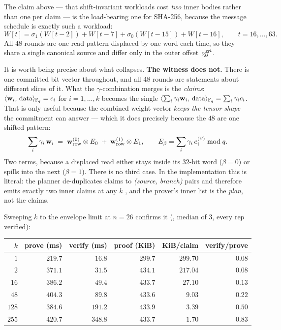The claim above --- that shift-invariant workloads cost \emph{two} inner bodies
rather than one per claim --- is the load-bearing one for SHA-256, because the
message schedule is exactly such a workload:
\[
  W[t]=\sigma_1(W[t-2])+W[t-7]+\sigma_0(W[t-15])+W[t-16],
  \qquad t=16,\dots,63 .
\]
All $48$ rounds are one read pattern displaced by one word each time, so they
share a single canonical source and differ only in the outer offset $\mathit{off}^t$.

It is worth being precise about what collapses. \textbf{The witness does not.}
There is one committed bit vector throughout, and all $48$ rounds are statements
about different slices of it. What the $\gamma$-combination merges is the
\emph{claims}: $\langle \mathbf{w}_i,\, \text{data}\rangle_{\mathbb{F}_q}=c_i$ for $i=1,\dots,k$ becomes the single
$\langle \sum_i\gamma_i\mathbf{w}_i,\, \text{data}\rangle_{\mathbb{F}_q}=\sum_i\gamma_ic_i$. That is only useful
because the combined weight vector \emph{keeps the tensor shape} the commitment
can answer --- which it does precisely because the $48$ are one shifted pattern:
\[
  \sum_i \gamma_i\,\mathbf{w}_i
  \;=\; \mathbf{w}_{\mathrm{row}}^{(0)}\otimes E_0 \;+\; \mathbf{w}_{\mathrm{row}}^{(1)}\otimes E_1,
  \qquad E_\beta=\sum_i \gamma_i\,e_i^{(\beta)} \bmod q .
\]
Two terms, because a displaced read either stays inside its $32$-bit word
($\beta{=}0$) or spills into the next ($\beta{=}1$). There is no third case.
In the implementation this is literal: the planner de-duplicates claims to
\emph{(source, branch)} pairs and therefore emits exactly two inner claims at any
$k$ , and the prover's inner
list is the \emph{plan}, not the claims.

Sweeping $k$ to the envelope limit at $n{=}26$ confirms it
(, median of $3$, every rep verified):

\begin{center}\small
\begin{tabular}{@{}rrrrrr@{}}
\toprule
$k$ & prove (ms) & verify (ms) & proof (KiB) & KiB/claim & verify/prove\\
\midrule
$1$   & $219.7$ & $16.8$  & $299.7$ & $299.70$ & $0.08$\\
$2$   & $371.1$ & $31.5$  & $434.1$ & $217.04$ & $0.08$\\
$16$  & $386.2$ & $49.4$  & $433.7$ & $27.10$  & $0.13$\\
$48$  & $404.3$ & $89.8$  & $433.6$ & $9.03$   & $0.22$\\
$128$ & $384.6$ & $191.2$ & $433.9$ & $3.39$   & $0.50$\\
$255$ & $420.7$ & $348.8$ & $433.7$ & $1.70$   & $\mathbf{0.83}$\\
\bottomrule
\end{tabular}
\end{center}

